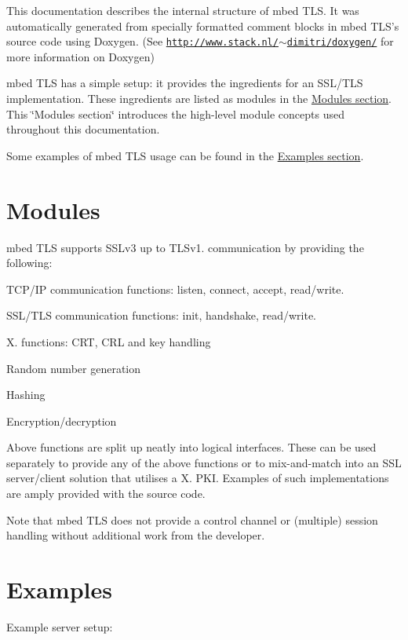 This documentation describes the internal structure of mbed T\-L\-S. It was automatically generated from specially formatted comment blocks in mbed T\-L\-S's source code using Doxygen. (See \href{http://www.stack.nl/~dimitri/doxygen/}{\tt http\-://www.\-stack.\-nl/$\sim$dimitri/doxygen/} for more information on Doxygen)

mbed T\-L\-S has a simple setup\-: it provides the ingredients for an S\-S\-L/\-T\-L\-S implementation. These ingredients are listed as modules in the \hyperlink{index_mainpage_modules}{Modules section}. This \char`\"{}\-Modules section\char`\"{} introduces the high-\/level module concepts used throughout this documentation.\par
 Some examples of mbed T\-L\-S usage can be found in the \hyperlink{index_mainpage_examples}{Examples section}.\hypertarget{index_mainpage_modules}{}\section{Modules}\label{index_mainpage_modules}
mbed T\-L\-S supports S\-S\-Lv3 up to T\-L\-Sv1. communication by providing the following\-:
\begin{DoxyItemize}
\item T\-C\-P/\-I\-P communication functions\-: listen, connect, accept, read/write.
\item S\-S\-L/\-T\-L\-S communication functions\-: init, handshake, read/write.
\item X. functions\-: C\-R\-T, C\-R\-L and key handling
\item Random number generation
\item Hashing
\item Encryption/decryption
\end{DoxyItemize}

Above functions are split up neatly into logical interfaces. These can be used separately to provide any of the above functions or to mix-\/and-\/match into an S\-S\-L server/client solution that utilises a X. P\-K\-I. Examples of such implementations are amply provided with the source code.

Note that mbed T\-L\-S does not provide a control channel or (multiple) session handling without additional work from the developer.\hypertarget{index_mainpage_examples}{}\section{Examples}\label{index_mainpage_examples}
Example server setup\-:

